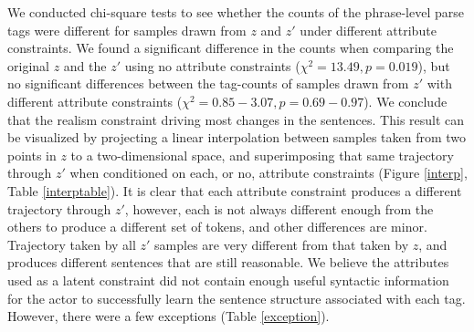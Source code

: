 \documentclass[11pt,letterpaper]{article}
\begin{document}
We conducted chi-square tests to see whether the counts of the phrase-level parse tags were different for samples drawn from $z$ and $z'$ under different attribute constraints. We found a significant difference in the counts when comparing the original $z$ and the $z'$ using no attribute constraints ($\chi^2=13.49, p=0.019$), but no significant differences between the tag-counts of samples drawn from $z'$ with different attribute constraints ($\chi^2=0.85-3.07, p=0.69-0.97$). We conclude that the realism constraint driving most changes in the sentences. This result can be visualized by projecting a linear interpolation between samples taken from two points in $z$ to a two-dimensional space, and superimposing that same trajectory through $z'$ when conditioned on each, or no, attribute constraints (Figure \ref{interp}, Table \ref{interptable}). It is clear that each attribute constraint produces a different trajectory through $z'$, however, each is not always different enough from the others to produce a different set of tokens, and other differences are minor. Trajectory taken by all $z'$ samples are very different from that taken by $z$, and produces different sentences that are still reasonable. We believe the attributes used as a latent constraint did not contain enough useful syntactic information for the actor to successfully learn the sentence structure associated with each tag. However, there were a few exceptions (Table \ref{exception}).
\end{document}
